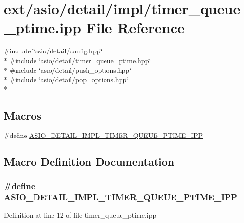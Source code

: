\hypertarget{timer__queue__ptime_8ipp}{}\section{ext/asio/detail/impl/timer\+\_\+queue\+\_\+ptime.ipp File Reference}
\label{timer__queue__ptime_8ipp}
{\ttfamily \#include \char`\"{}asio/detail/config.\+hpp\char`\"{}}\\*
{\ttfamily \#include \char`\"{}asio/detail/timer\+\_\+queue\+\_\+ptime.\+hpp\char`\"{}}\\*
{\ttfamily \#include \char`\"{}asio/detail/push\+\_\+options.\+hpp\char`\"{}}\\*
{\ttfamily \#include \char`\"{}asio/detail/pop\+\_\+options.\+hpp\char`\"{}}\\*
\subsection*{Macros}
\begin{DoxyCompactItemize}
\item 
\#define \hyperlink{timer__queue__ptime_8ipp_a33d04215ea2ed71bd4c4f80fc704eeec}{A\+S\+I\+O\+\_\+\+D\+E\+T\+A\+I\+L\+\_\+\+I\+M\+P\+L\+\_\+\+T\+I\+M\+E\+R\+\_\+\+Q\+U\+E\+U\+E\+\_\+\+P\+T\+I\+M\+E\+\_\+\+I\+P\+P}
\end{DoxyCompactItemize}


\subsection{Macro Definition Documentation}
\hypertarget{timer__queue__ptime_8ipp_a33d04215ea2ed71bd4c4f80fc704eeec}{}
\subsubsection[{A\+S\+I\+O\+\_\+\+D\+E\+T\+A\+I\+L\+\_\+\+I\+M\+P\+L\+\_\+\+T\+I\+M\+E\+R\+\_\+\+Q\+U\+E\+U\+E\+\_\+\+P\+T\+I\+M\+E\+\_\+\+I\+P\+P}]{\setlength{\rightskip}{0pt plus 5cm}\#define A\+S\+I\+O\+\_\+\+D\+E\+T\+A\+I\+L\+\_\+\+I\+M\+P\+L\+\_\+\+T\+I\+M\+E\+R\+\_\+\+Q\+U\+E\+U\+E\+\_\+\+P\+T\+I\+M\+E\+\_\+\+I\+P\+P}\label{timer__queue__ptime_8ipp_a33d04215ea2ed71bd4c4f80fc704eeec}


Definition at line 12 of file timer\+\_\+queue\+\_\+ptime.\+ipp.

